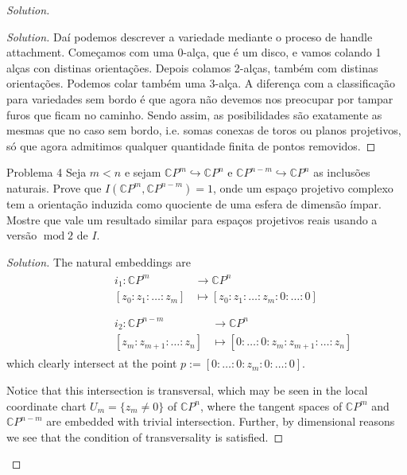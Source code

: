 \begin{proof}[Solution]
\begin{proof}[Solution]
Daí podemos descrever a variedade mediante o proceso de handle attachment. Começamos com uma 0-alça, que é um disco, e vamos colando 1 alças con distinas orientações. Depois colamos 2-alças, também com distinas orientações. Podemos colar também uma 3-alça. A diferença com a classificação para variedades sem bordo é que agora não devemos nos preocupar por tampar furos que ficam no caminho. Sendo assim, as posibilidades são exatamente as mesmas que no caso sem bordo, i.e. somas conexas de toros ou planos projetivos, só que agora admitimos qualquer quantidade finita de pontos removidos.

\end{proof}

\begin{thing1}{Problema 4}\label{prob:a 4}\leavevmode
Seja \(m<n\) e sejam \(\mathbb{C}P^{m}\hookrightarrow \mathbb{C}P^{n}\) e \(\mathbb{C}P^{n-m}\hookrightarrow \mathbb{C}P^{n}\) as inclusões naturais. Prove que \(I(\mathbb{C}P^{m},\mathbb{C}P^{n-m})=1\), onde um espaço projetivo complexo tem a orientação induzida como quociente de uma esfera de dimensão ímpar. Mostre que vale um resultado similar para espaços projetivos reais usando a versão \(\operatorname{mod}2\) de \(I\).
\end{thing1}

\begin{proof}[Solution]\leavevmode
The natural embeddings are
\begin{align*}
&\begin{aligned}i_1: \mathbb{C}P^m &\longrightarrow \mathbb{C}P^n \\
	[z_0:z_1:\ldots:z_m] &\longmapsto [z_0:z_1:\ldots:z_m:0:\ldots:0]
\end{aligned}
\\\\\qquad \qquad & \begin{aligned}	i_2: \mathbb{C}P^{n-m} &\longrightarrow \mathbb{C}P^n \\
[z_{m}:z_{m+1}:\ldots:z_n] &\longmapsto [0:\ldots:0:z_{m}:z_{m+1}:\ldots:z_n] \end{aligned}\end{align*}
which clearly intersect at the point \(p:=[0:\ldots:0:z_m:0:\ldots:0]\).

Notice that this intersection is transversal, which may be seen in the local coordinate chart \(U_m=\{z_m\neq 0\}\) of \(\mathbb{C}P^{n}\), where the tangent spaces of \(\mathbb{C}P^{m}\) and \(\mathbb{C}P^{n-m}\) are embedded with trivial intersection. Further, by dimensional reasons we see that the condition of transversality is satisfied.


\end{proof}
\end{proof}

